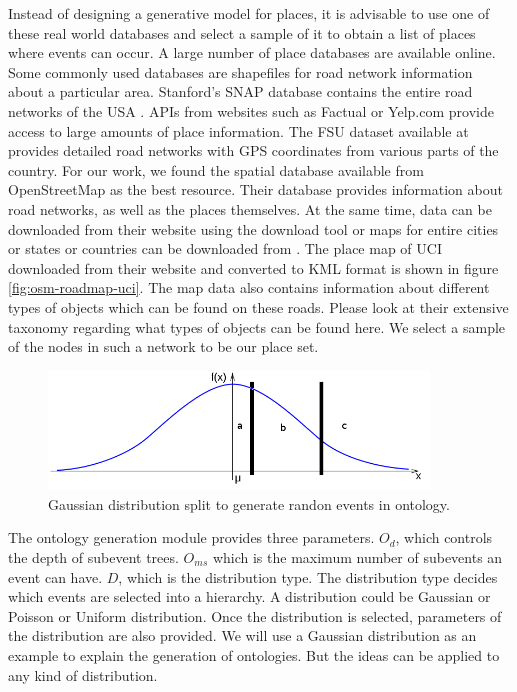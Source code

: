 Instead of designing a generative model for places, it is advisable to use one of these real world databases and select a sample of it to obtain a list of places where events can occur. A large number of place databases are available online. Some commonly used databases are shapefiles \cite{esri:tigerline} for road network information about a particular area. Stanford's SNAP database contains the entire road networks of the USA \cite{stanford:snap}. APIs from websites such as Factual or Yelp.com provide access to large amounts of place information. The FSU dataset available at \cite{fsu:spatial} provides detailed road networks with GPS coordinates from various parts of the country. For our work, we found the spatial database available from OpenStreetMap as the best resource. Their database provides information about road networks, as well as the places themselves. At the same time, data can be downloaded from their website using the download tool or maps for entire cities or states or countries can be downloaded from \cite{cloudmade:download}. The place map of UCI downloaded from their website and converted to KML format is shown in figure \ref{fig:osm-roadmap-uci}. The map data also contains information about different types of objects which can be found on these roads. Please look at their extensive taxonomy \cite{osm:taxonomy} regarding what types of objects can be found here. We select a sample of the nodes in such a network to be our place set.

\begin{figure}[t]
\centering
\includegraphics[width=0.9\textwidth]{media/chapter5/perf/gaussian-split.png}
\caption{Gaussian distribution split to generate randon events in ontology.}
\label{fig:gaussian-split}
\end{figure}

The ontology generation module provides three parameters. $O_d$, which controls the depth of subevent trees. $O_{ms}$ which is the maximum number of subevents an event can have. $D$, which is the distribution type. The distribution type decides which events are selected into a hierarchy. A distribution could be Gaussian or Poisson or Uniform distribution. Once the distribution is selected, parameters of the distribution are also provided. We will use a Gaussian distribution as an example to explain the generation of ontologies. But the ideas can be applied to any kind of distribution. 

